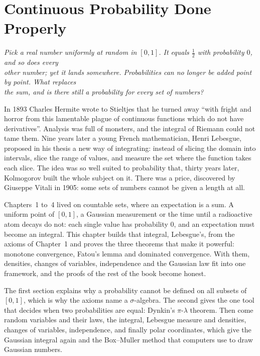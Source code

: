\chapter{Continuous Probability Done Properly}

\begin{center}\itshape
Pick a real number uniformly at random in $[0,1]$. It equals $\frac12$ with probability $0$, and so does every\\
other number; yet it lands somewhere. Probabilities can no longer be added point by point. What replaces\\
the sum, and is there still a probability for \emph{every} set of numbers?
\end{center}

In 1893 Charles Hermite wrote to Stieltjes that he turned away ``with fright and horror from this lamentable plague of continuous functions which
do not have derivatives''. Analysis was full of monsters, and the integral of Riemann could not tame them. Nine years later a young French
mathematician, Henri Lebesgue, proposed in his thesis a new way of integrating: instead of slicing the domain into intervals, slice the range of
values, and measure the set where the function takes each slice. The idea was so well suited to probability that, thirty years later, Kolmogorov
built the whole subject on it. There was a price, discovered by Giuseppe Vitali in 1905: some sets of numbers cannot be given a length at all.

Chapters~1 to~4 lived on countable sets, where an expectation is a sum. A uniform point of $[0,1]$, a Gaussian
measurement or the time until a radioactive atom decays do not: each single value has probability $0$, and an
expectation must become an integral. This chapter builds that integral, Lebesgue's, from the axioms of Chapter~1
and proves the three theorems that make it powerful: monotone convergence, Fatou's lemma and dominated convergence.
With them, densities, changes of variables, independence and the Gaussian law fit into one framework, and the
proofs of the rest of the book become honest.

The first section explains why a probability cannot be defined on all subsets of $[0,1]$, which is why the axioms
name a $\sigma$-algebra. The second gives the one tool that decides when two probabilities are equal: Dynkin's
$\pi$-$\lambda$ theorem. Then come random variables and their laws, the integral, Lebesgue measure and densities,
changes of variables, independence, and finally polar coordinates, which give the Gaussian integral again and the
Box--Muller method that computers use to draw Gaussian numbers.

